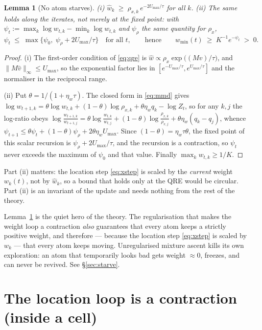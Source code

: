 \documentclass[11pt,a4paper]{article}
\theoremstyle{plain}
\newtheorem{lemma}[theorem]{Lemma}
\theoremstyle{definition}
\theoremstyle{remark}
\newcommand{\norm}[1]{\lVert #1 \rVert}
\begin{document}
\begin{lemma}[No atom starves]\label{lem:full}
\emph{(i)} $\hat w_k \;\ge\; \rho_{x,k}\,e^{-2U_{\max}/\tau}$ for all $k$.
\emph{(ii)} The same holds along the iterates, not merely at the fixed point: with
$\psi_t:=\max_k\log w_{t,k}-\min_k\log w_{t,k}$ and $\psi_\rho$ the same quantity for
$\rho_x$,
\[
\psi_t\;\le\;\max\{\psi_0,\;\psi_\rho+2U_{\max}/\tau\}\quad\text{for all }t,
\qquad\text{hence}\qquad w_{\min}(t)\;\ge\;K^{-1}e^{-\psi_t}\;>\;0 .
\]
\end{lemma}
\begin{proof}
(i) The first-order condition of \eqref{eq:qre} is
$\hat w \propto \rho_x\exp\big((M\hat v)/\tau\big)$, and $\norm{M\hat v}_\infty\le U_{\max}$,
so the exponential factor lies in $[e^{-U_{\max}/\tau},e^{U_{\max}/\tau}]$ and the
normaliser in the reciprocal range.

(ii) Put $\theta=1/(1+\eta_w\tau)$. The closed form in \eqref{eq:mmd} gives
$\log w_{t+1,k}=\theta\log w_{t,k}+(1-\theta)\log\rho_{x,k}+\theta\eta_wq_k-\log Z_t$,
so for any $k,j$ the log-ratio obeys
$\log\frac{w_{t+1,k}}{w_{t+1,j}}=\theta\log\frac{w_{t,k}}{w_{t,j}}
+(1-\theta)\log\frac{\rho_{x,k}}{\rho_{x,j}}+\theta\eta_w(q_k-q_j)$,
whence $\psi_{t+1}\le\theta\psi_t+(1-\theta)\psi_\rho+2\theta\eta_wU_{\max}$. Since
$(1-\theta)=\eta_w\tau\theta$, the fixed point of this scalar recursion is
$\psi_\rho+2U_{\max}/\tau$, and the recursion is a contraction, so $\psi_t$ never
exceeds the maximum of $\psi_0$ and that value. Finally $\max_kw_{t,k}\ge1/K$.
\end{proof}

\noindent Part (ii) matters: the location step \eqref{eq:xstep} is scaled by the
\emph{current} weight $w_k(t)$, not by $\hat w_k$, so a bound that holds only at the
QRE would be circular. Part (ii) is an invariant of the update and needs nothing from
the rest of the theory.

\noindent Lemma~\ref{lem:full} is the quiet hero of the theory. The regularisation
that makes the weight loop a contraction \emph{also} guarantees that every atom keeps
a strictly positive weight, and therefore --- because the location step
\eqref{eq:xstep} is scaled by $w_k$ --- that every atom keeps moving. Unregularised
mixture ascent kills its own exploration: an atom that temporarily looks bad gets
weight $\approx0$, freezes, and can never be revived. See \S\ref{sec:starve}.

\section{The location loop is a contraction (inside a cell)}\label{sec:locations}
\end{document}
